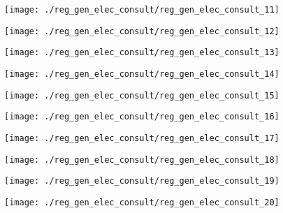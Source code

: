 \begin{figure}[!ht]
    \centering
    \texttt{[image: ./reg\_gen\_elec\_consult/reg\_gen\_elec\_consult\_11]}
\end{figure}
\clearpage

\begin{figure}[!ht]
    \centering
    \texttt{[image: ./reg\_gen\_elec\_consult/reg\_gen\_elec\_consult\_12]}
\end{figure}
\clearpage

\begin{figure}[!ht]
    \centering
    \texttt{[image: ./reg\_gen\_elec\_consult/reg\_gen\_elec\_consult\_13]}
\end{figure}
\clearpage

\begin{figure}[!ht]
    \centering
    \texttt{[image: ./reg\_gen\_elec\_consult/reg\_gen\_elec\_consult\_14]}
\end{figure}
\clearpage

\begin{figure}[!ht]
    \centering
    \texttt{[image: ./reg\_gen\_elec\_consult/reg\_gen\_elec\_consult\_15]}
\end{figure}
\clearpage

\begin{figure}[!ht]
    \centering
    \texttt{[image: ./reg\_gen\_elec\_consult/reg\_gen\_elec\_consult\_16]}
\end{figure}
\clearpage

\begin{figure}[!ht]
    \centering
    \texttt{[image: ./reg\_gen\_elec\_consult/reg\_gen\_elec\_consult\_17]}
\end{figure}
\clearpage

\begin{figure}[!ht]
    \centering
    \texttt{[image: ./reg\_gen\_elec\_consult/reg\_gen\_elec\_consult\_18]}
\end{figure}
\clearpage

\begin{figure}[!ht]
    \centering
    \texttt{[image: ./reg\_gen\_elec\_consult/reg\_gen\_elec\_consult\_19]}
\end{figure}
\clearpage

\begin{figure}[!ht]
    \centering
    \texttt{[image: ./reg\_gen\_elec\_consult/reg\_gen\_elec\_consult\_20]}
\end{figure}
\clearpage


